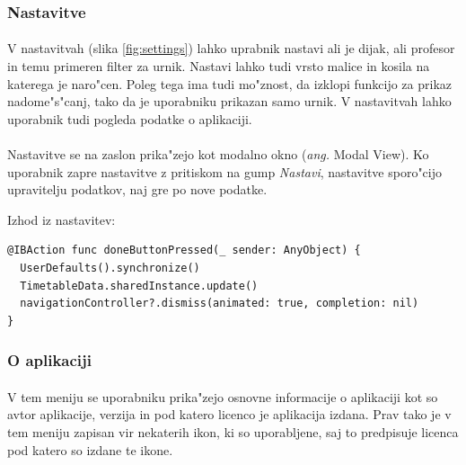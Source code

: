 \subsubsection{Nastavitve}
\paragraph{}V nastavitvah (slika \ref{fig:settings}) lahko uprabnik nastavi ali je dijak, ali profesor in temu primeren filter za urnik. Nastavi lahko tudi vrsto malice in kosila na katerega je naro"cen. Poleg tega ima tudi mo"znost, da izklopi funkcijo za prikaz nadome"s"canj, tako da je uporabniku prikazan samo urnik. V nastavitvah lahko uporabnik tudi pogleda podatke o aplikaciji.

\paragraph{}
Nastavitve se na zaslon prika"zejo kot modalno okno (\textit{ang.} Modal View). Ko uporabnik zapre nastavitve z pritiskom na gump \textit{Nastavi}, nastavitve sporo"cijo upravitelju podatkov, naj gre po nove podatke.

\begin{center}
	Izhod iz nastavitev:
\end{center}
\begin{verbatim}
@IBAction func doneButtonPressed(_ sender: AnyObject) {
  UserDefaults().synchronize()
  TimetableData.sharedInstance.update()
  navigationController?.dismiss(animated: true, completion: nil)
}
\end{verbatim}


\subsubsection{O aplikaciji}
\paragraph{}V tem meniju se uporabniku prika"zejo osnovne informacije o aplikaciji kot so avtor aplikacije, verzija in pod katero licenco\cite{license-wiki} je aplikacija izdana. Prav tako je v tem meniju zapisan vir nekaterih ikon, ki so uporabljene, saj to predpisuje licenca pod katero so izdane te ikone.
